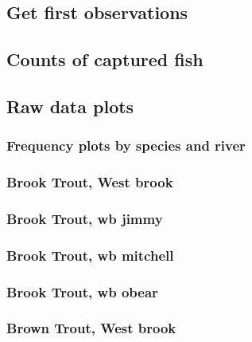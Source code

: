 \documentclass[
]{book}
\begin{document}
\hypertarget{get-first-observations}{%
\subsection{Get first observations}\label{get-first-observations}}

\hypertarget{counts-of-captured-fish}{%
\subsection{Counts of captured fish}\label{counts-of-captured-fish}}

\hypertarget{raw-data-plots}{%
\subsection{Raw data plots}\label{raw-data-plots}}

\hypertarget{frequency-plots-by-species-and-river}{%
\subsubsection{Frequency plots by species and river}\label{frequency-plots-by-species-and-river}}

\hypertarget{brook-trout-west-brook}{%
\subsubsection{Brook Trout, West brook}\label{brook-trout-west-brook}}

\hypertarget{brook-trout-wb-jimmy}{%
\subsubsection{Brook Trout, wb jimmy}\label{brook-trout-wb-jimmy}}

\hypertarget{brook-trout-wb-mitchell}{%
\subsubsection{Brook Trout, wb mitchell}\label{brook-trout-wb-mitchell}}

\hypertarget{brook-trout-wb-obear}{%
\subsubsection{Brook Trout, wb obear}\label{brook-trout-wb-obear}}

\hypertarget{brown-trout-west-brook}{%
\subsubsection{Brown Trout, West brook}\label{brown-trout-west-brook}}
\end{document}
